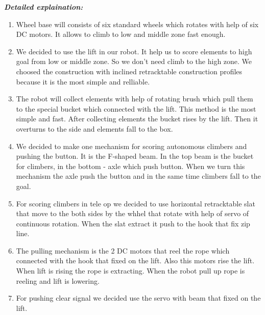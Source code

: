 \newline
\textit{\textbf{Detailed explaination:}}
\begin{enumerate}
	\item Wheel base will consists of six standard wheels which rotates with help of six DC motors. It allows to climb to low and middle zone fast enough.
	
	\item We decided to use the lift in our robot. It help us to score elements to high goal from low or middle zone. So we don't need climb to the high zone. We choosed the construction with inclined retracktable construction profiles because it is the most simple and relliable.
	
	\item The robot will collect elements with help of rotating brush which pull them to the special bucket which connected with the lift. This method is the most simple and fast. After collecting elements the bucket rises by the lift. Then it overturns to the side and elements fall to the box.
	
	\item We decided to make one mechanism for scoring autonomous climbers and pushing the button. It is the F-shaped beam. In the top beam is the bucket for climbers, in the bottom - axle which push button. When we turn this mechanism the axle push the button and in the same time climbers fall to the goal.
	
	\item For scoring climbers in tele op we decided to use horizontal retracktable slat that move to the both sides by the whhel that rotate with help of servo of continuous rotation. When the slat extract it push to the hook that fix zip line.
	
	\item The pulling mechanism is the 2 DC motors that reel the rope which connected with the hook that fixed on the lift. Also this motors rise the lift. When lift is rising the rope is extracting. When the robot pull up rope is reeling and lift is lowering. 
	
	\item For pushing clear signal we decided use the servo with beam that fixed on the lift.

	
\end{enumerate}

\newline


\fillpage
